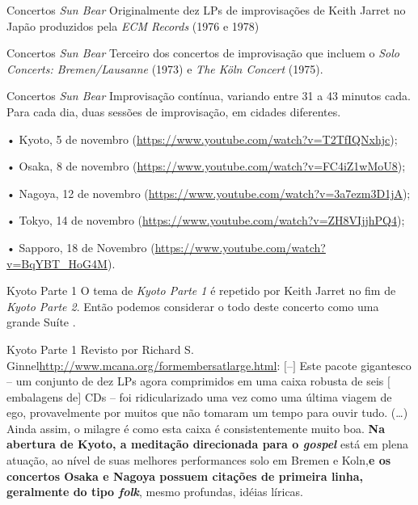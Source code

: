 \documentclass[aspectratio=169]{beamer}
\begin{document}
\begin{frame}{Concertos \emph{Sun Bear}}
Originalmente dez LPs  de improvisações de Keith Jarret no Japão produzidos pela \emph{ECM Records} (1976 e 1978)
\end{frame}

\begin{frame}{Concertos \emph{Sun Bear}}
Terceiro dos concertos de improvisação que incluem o \emph{Solo Concerts: Bremen/Lausanne} (1973) e \emph{The Köln Concert} (1975).
\end{frame}

\begin{frame}{Concertos \emph{Sun Bear}}
Improvisação contínua, variando entre 31 a 43 minutos cada. Para cada dia, duas sessões de improvisação, em cidades diferentes. 

• Kyoto, 5 de novembro (\url{https://www.youtube.com/watch?v=T2TfIQNxhjc}); 

• Osaka, 8 de novembro (\url{https://www.youtube.com/watch?v=FC4iZ1wMoU8}); 

• Nagoya, 12 de novembro (\url{https://www.youtube.com/watch?v=3a7ezm3D1jA});

• Tokyo, 14 de novembro (\url{https://www.youtube.com/watch?v=ZH8VIjjhPQ4}); 

• Sapporo, 18 de Novembro (\url{https://www.youtube.com/watch?v=BqYBT_HoG4M}).
\end{frame}

\begin{frame}{Kyoto Parte 1}
O tema de \emph{Kyoto Parte 1} é repetido por Keith Jarret no fim de \emph{Kyoto Parte 2}. Então podemos considerar o todo deste concerto como uma grande Suíte \cite[p.~129]{jarret_discography_2014}.
\end{frame}

\begin{frame}{Kyoto Parte 1}
Revisto por Richard S. Ginnel\url{http://www.mcana.org/formembersatlarge.html}: $[$--$]$ Este pacote gigantesco -- um conjunto de dez LPs agora comprimidos em uma caixa robusta de seis $[$embalagens de$]$ CDs -- foi ridicularizado uma vez como uma última viagem de ego, provavelmente por muitos que não tomaram um tempo para ouvir tudo. (\ldots) Ainda assim, o milagre é como esta caixa é consistentemente muito boa. \textbf{Na abertura de Kyoto, a meditação direcionada para o \emph{gospel}} está em plena atuação, ao nível de suas melhores performances solo em Bremen e Koln,\textbf{e os concertos Osaka e Nagoya possuem citações de primeira linha, geralmente do tipo \emph{folk}}, mesmo profundas, idéias líricas.
\end{frame}
\end{document}
